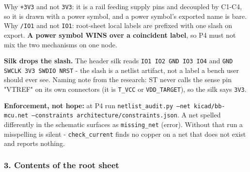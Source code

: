 \documentclass[11pt,a4paper]{article}
\begin{document}
Why \texttt{+3V3} and not \texttt{3V3}: it is a rail feeding supply pins and decoupled by C1-C4, so it is drawn with a power symbol, and a power symbol's exported name is bare. Why \texttt{/IO1} and not \texttt{IO1}: root-sheet local labels are prefixed with one slash on export. \textbf{A power symbol WINS over a coincident label}, so P4 must not mix the two mechanisms on one node.

\textbf{Silk drops the slash.} The header silk reads \texttt{IO1 IO2 GND IO3 IO4} and \texttt{GND SWCLK 3V3 SWDIO NRST} - the slash is a netlist artifact, not a label a bench user should ever see. Naming note from the research: ST never calls the sense pin "VTREF" on its own connectors (it is \texttt{T\_VCC} or \texttt{VDD\_TARGET}), so the silk says \texttt{3V3}.

\textbf{Enforcement, not hope:} at P4 run \texttt{netlist\_audit.py --net kicad/bb-mcu.net --constraints architecture/constraints.json}. A net spelled differently in the schematic surfaces as \texttt{missing\_net} (error). Without that run a misspelling is silent - \texttt{check\_current} finds no copper on a net that does not exist and reports nothing.

\subsubsection*{3. Contents of the root sheet}
\end{document}
